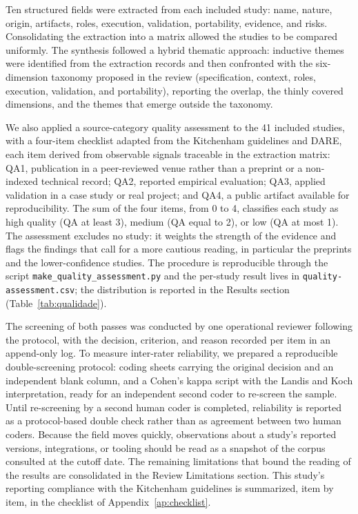 Ten structured fields were extracted from each included study: name, nature, origin, artifacts, roles, execution, validation, portability, evidence, and risks. Consolidating the extraction into a matrix allowed the studies to be compared uniformly. The synthesis followed a hybrid thematic approach: inductive themes were identified from the extraction records and then confronted with the six-dimension taxonomy proposed in the review (specification, context, roles, execution, validation, and portability), reporting the overlap, the thinly covered dimensions, and the themes that emerge outside the taxonomy.

We also applied a source-category quality assessment to the 41 included studies, with a four-item checklist adapted from the Kitchenham guidelines and DARE, each item derived from observable signals traceable in the extraction matrix: QA1, publication in a peer-reviewed venue rather than a preprint or a non-indexed technical record; QA2, reported empirical evaluation; QA3, applied validation in a case study or real project; and QA4, a public artifact available for reproducibility. The sum of the four items, from 0 to 4, classifies each study as high quality (QA at least 3), medium (QA equal to 2), or low (QA at most 1). The assessment excludes no study: it weights the strength of the evidence and flags the findings that call for a more cautious reading, in particular the preprints and the lower-confidence studies. The procedure is reproducible through the script \texttt{make\_quality\_assessment.py} and the per-study result lives in \texttt{quality-assessment.csv}; the distribution is reported in the Results section (Table~\ref{tab:qualidade}).

The screening of both passes was conducted by one operational reviewer following the protocol, with the decision, criterion, and reason recorded per item in an append-only log. To measure inter-rater reliability, we prepared a reproducible double-screening protocol: coding sheets carrying the original decision and an independent blank column, and a Cohen's kappa script with the Landis and Koch interpretation, ready for an independent second coder to re-screen the sample. Until re-screening by a second human coder is completed, reliability is reported as a protocol-based double check rather than as agreement between two human coders. Because the field moves quickly, observations about a study's reported versions, integrations, or tooling should be read as a snapshot of the corpus consulted at the cutoff date. The remaining limitations that bound the reading of the results are consolidated in the Review Limitations section. This study's reporting compliance with the Kitchenham guidelines is summarized, item by item, in the checklist of Appendix~\ref{ap:checklist}.
